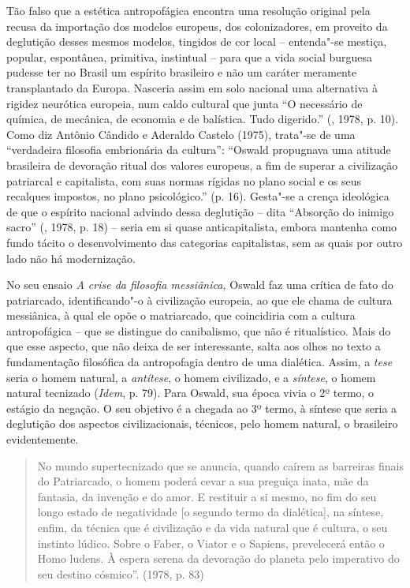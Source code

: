 {Tão falso que a estética antropofágica encontra uma resolução original
pela recusa da importação dos modelos europeus, dos colonizadores, em
proveito da deglutição desses mesmos modelos, tingidos de cor local --
entenda"-se mestiça, popular, espontânea, primitiva, instintual -- para
que a vida social burguesa pudesse ter no Brasil um espírito brasileiro
e não um caráter meramente transplantado da Europa. Nasceria assim em
solo nacional uma alternativa à rigidez neurótica europeia, num caldo
cultural que junta ``O necessário de química, de mecânica, de economia e
de balística. Tudo digerido.'' (, 1978, p. 10). Como diz Antônio
Cândido e Aderaldo Castelo (1975), trata"-se de uma ``verdadeira
filosofia embrionária da cultura'': ``Oswald propugnava uma atitude
brasileira de devoração ritual dos valores europeus, a fim de superar a
civilização patriarcal e capitalista, com suas normas rígidas no plano
social e os seus recalques impostos, no plano psicológico.'' (p. 16).
Gesta"-se a crença ideológica de que o espírito nacional advindo dessa
deglutição -- dita ``Absorção do inimigo sacro'' (, 1978, p. 18)
-- seria em si quase anticapitalista, embora mantenha como fundo tácito
o desenvolvimento das categorias capitalistas, sem as quais por outro
lado não há modernização.

No seu ensaio \emph{A crise da filosofia messiânica,} Oswald faz uma
crítica de fato do patriarcado, identificando"-o à civilização europeia,
ao que ele chama de cultura messiânica, à qual ele opõe o matriarcado,
que coincidiria com a cultura antropofágica -- que se distingue do
canibalismo, que não é ritualístico. Mais do que esse aspecto, que não
deixa de ser interessante, salta aos olhos no texto a fundamentação
filosófica da antropofagia dentro de uma dialética. Assim, a \emph{tese}
seria o homem natural, a \emph{antítese}, o homem civilizado, e a
\emph{síntese}, o homem natural tecnizado (\emph{Idem}, p. 79). Para
Oswald, sua época vivia o 2º termo, o estágio da negação. O seu objetivo
é a chegada ao 3º termo, à síntese que seria a deglutição dos aspectos
civilizacionais, técnicos, pelo homem natural, o brasileiro
evidentemente.

\begin{quote}
No mundo supertecnizado que se anuncia, quando caírem as barreiras
finais do Patriarcado, o homem poderá cevar a sua preguiça inata, mãe da
fantasia, da invenção e do amor. E restituir a si mesmo, no fim do seu
longo estado de negatividade [o segundo termo da dialética], na
síntese, enfim, da técnica que é civilização e da vida natural que é
cultura, o seu instinto lúdico. Sobre o Faber, o Viator e o Sapiens,
prevelecerá então o Homo ludens. À espera serena da devoração do planeta
pelo imperativo do seu destino cósmico''. (1978, p. 83)
\end{quote}

}
